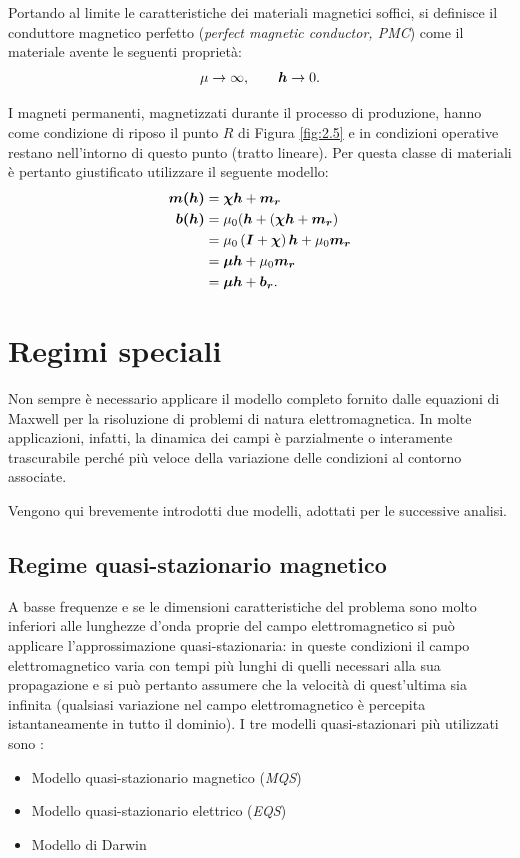 Portando al limite le caratteristiche dei materiali magnetici soffici, si definisce il conduttore magnetico perfetto (\textit{perfect magnetic conductor, PMC}) come il materiale avente le seguenti proprietà:
\begin{equation}
\label{eq:2pmc}
\mu \rightarrow \infty,\qquad \boldsymbol{h}\rightarrow 0.
\end{equation}

I magneti permanenti, magnetizzati durante il processo di produzione, hanno come condizione di riposo il punto $R$ di Figura \ref{fig:2.5} e in condizioni operative restano nell'intorno di questo punto (tratto lineare). Per questa classe di materiali è pertanto giustificato utilizzare il seguente modello:
\begin{align}
\label{eq:2costmag}
\boldsymbol{m(h)}&=\boldsymbol{\chi}\boldsymbol{h}+\boldsymbol{m_r}\nonumber \\
\boldsymbol{b(h)}&=\mu_0(\boldsymbol{h}+\left(\boldsymbol{\chi}\boldsymbol{h}+\boldsymbol{m_r}\right) \nonumber\\
&=\mu_0\left(\boldsymbol{I}+\boldsymbol{\chi}\right)\boldsymbol{h}+\mu_0 \boldsymbol{m_r} \nonumber \\
&=\boldsymbol{\mu}\boldsymbol{h}+\mu_0 \boldsymbol{m_r}\nonumber\\
&= \boldsymbol{\mu}\boldsymbol{h}+\boldsymbol{b_r}.
\end{align}
\section{Regimi speciali}
Non sempre è necessario applicare il modello completo fornito dalle equazioni di Maxwell per la risoluzione di problemi di natura elettromagnetica. In molte applicazioni, infatti, la dinamica dei campi è parzialmente o interamente trascurabile perché più veloce della variazione delle condizioni al contorno associate. 

Vengono qui brevemente introdotti due modelli, adottati per le successive analisi.

\subsection{Regime quasi-stazionario magnetico}
A basse frequenze e se le dimensioni caratteristiche del problema sono molto inferiori alle lunghezze d'onda proprie del campo elettromagnetico si può applicare l'approssimazione quasi-stazionaria: in queste condizioni il campo elettromagnetico varia con tempi più lunghi di quelli necessari alla sua propagazione e si può pertanto assumere che la velocità di quest'ultima sia infinita (qualsiasi variazione nel campo elettromagnetico è percepita istantaneamente in tutto il dominio). I tre modelli quasi-stazionari più utilizzati sono \citep{larsson_electromagnetics_2007}:
\begin{itemize}
\item Modello quasi-stazionario magnetico (\textit{MQS})
\item Modello quasi-stazionario elettrico (\textit{EQS})
\item Modello di Darwin
\end{itemize}

